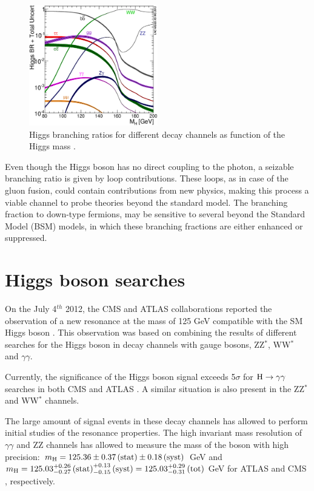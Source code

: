 \begin{figure}
\centering
\includegraphics[width=0.5\textwidth]{1_Introduction_Th_and_Exp/pics/Higgs_BR_LM.eps}
\caption{Higgs branching ratios for different decay channels as function of the Higgs mass \cite{Heinemeyer:2013tqa}.}
\label{fig:hbr}
\end{figure}

Even though the Higgs boson has no direct coupling to the photon, a seizable branching ratio is given by loop contributions. These loops, as in case of the gluon fusion, could contain contributions from new physics, making this process a viable channel to probe theories beyond the standard model. The branching fraction to down-type fermions, may be sensitive to several beyond the Standard Model (BSM) models, in which these branching fractions are either enhanced or suppressed.

\section{Higgs boson searches}
\label{sec:higgs_res}

On the July 4$^{th}$ 2012, the CMS and ATLAS collaborations reported the observation of a new resonance at the mass of 125 GeV compatible with the SM Higgs boson \cite{Chatrchyan:2013lba}. This observation was based on combining the results of different searches for the Higgs boson in decay channels with gauge bosons, ZZ$^\ast$, WW$^\ast$ and $\gamma\gamma$.

Currently, the significance of the Higgs boson signal exceeds 5$\sigma$ for $\mathrm{H}\rightarrow\gamma\gamma$ searches in both CMS and ATLAS \cite{Khachatryan:2014ira, ATLASCONF:2014009}. A similar situation is also present in the ZZ$^\ast$ and WW$^\ast$ channels.

The large amount of signal events in these decay channels has allowed to perform initial studies of the resonance properties. The high invariant mass resolution of $\gamma\gamma$ and ZZ channels has allowed to measure the mass of the boson with high precision: $m_{\mathrm{H}} = 125.36 \pm 0.37\, \mathrm{(stat)} \pm 0.18\, \mathrm{(syst)}$ GeV and $m_{\mathrm{H}} = 125.03^{+0.26}_{-0.27} \,\mathrm{(stat)}^{+0.13}_{-0.15}  \,\mathrm{(syst)} = 125.03^{+0.29}_{-0.31} \, \mathrm{(tot)}$ GeV for ATLAS \cite{Aad:2014aba} and CMS \cite{CMS:2014ega}, respectively.

